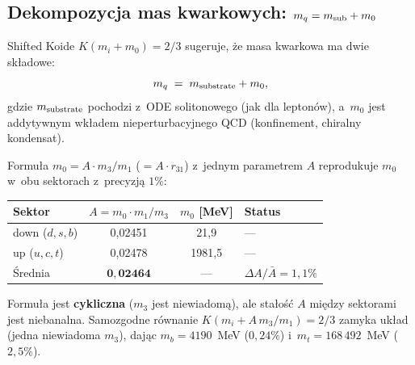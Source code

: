\subsection{Dekompozycja mas kwarkowych: $m_q = m_{\rm sub} + m_0$}%
\label{app:X-decomposition}

Shifted Koide $K(m_i + m_0) = 2/3$ sugeruje, \.ze masa kwarkowa
ma dwie sk\l{}adowe:
\begin{equation}\label{eq:X-decomposition}
  m_q \;=\; m_{\rm substrate} + m_0,
\end{equation}
gdzie $m_{\rm substrate}$ pochodzi z~ODE solitonowego (jak dla lepton\'ow),
a~$m_0$ jest addytywnym wk\l{}adem nieperturbacyjnego QCD
(konfinement, chiralny kondensat).

\begin{result}%
\label{res:X-A-constant}
Formu\l{}a $m_0 = A \cdot m_3/m_1$ ($= A \cdot r_{31}$) z~jednym parametrem
$A$ reprodukuje $m_0$ w~obu sektorach z~precyzj\k{a} $1\%$:
\begin{center}\footnotesize
\begin{tabular}{@{}lccl@{}}
\toprule
  Sektor & $A = m_0 \cdot m_1/m_3$ & $m_0$ [MeV] & Status \\
\midrule
  down ($d, s, b$) & 0{,}02451 & 21{,}9 & --- \\
  up ($u, c, t$)   & 0{,}02478 & 1981{,}5 & --- \\
\midrule
  \'Srednia         & $\mathbf{0{,}02464}$ & --- & $\Delta A/\bar{A} = 1{,}1\%$ \\
\bottomrule
\end{tabular}
\end{center}
Formu\l{}a jest \textbf{cykliczna} ($m_3$ jest niewiadom\k{a}),
ale sta\l{}o\'s\'c $A$ mi\k{e}dzy sektorami jest niebanalna.
Samozgodne r\'ownanie $K(m_i + A\,m_3/m_1) = 2/3$ zamyka uk\l{}ad
(jedna niewiadoma $m_3$), daj\k{a}c $m_b = 4190$~MeV ($0{,}24\%$)
i~$m_t = 168\,492$~MeV ($2{,}5\%$).
\end{result}

